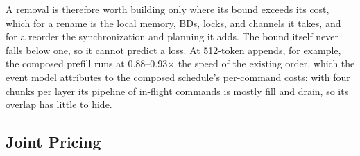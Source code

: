 A removal is therefore worth building only where its bound exceeds its cost, which for a rename is the local memory, BDs, locks, and channels it takes, and for a reorder the synchronization and planning it adds.
The bound itself never falls below one, so it cannot predict a loss.
At 512-token appends, for example, the composed prefill runs at 0.88--0.93$\times$ the speed of the existing order, which the event model attributes to the composed schedule's per-command costs: with four chunks per layer its pipeline of in-flight commands is mostly fill and drain, so its overlap has little to hide.

\subsection{Joint Pricing}
\label{subsec:joint}

